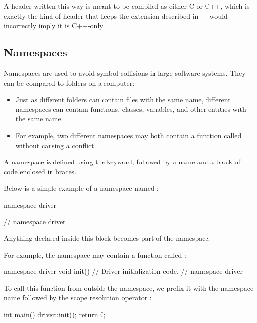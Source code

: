 \note A header written this way is meant to be compiled as either C or C++, which is exactly the
kind of header that keeps the  extension described in  --- 
would incorrectly imply it is C++-only.

\subsection{Namespaces}
\label{c1:sec:namespaces}
Namespaces are used to avoid symbol collisions in large software systems. They can be compared to
folders on a computer:
\begin{itemize}
  \item Just as different folders can contain files with the same name, different namespaces can
    contain functions, classes, variables, and other entities with the same name.
  \item For example, two different namespaces may both contain a function called 
    without causing a conflict.
\end{itemize}
A namespace is defined using the  keyword, followed by a name and a block of code
enclosed in braces.

Below is a simple example of a namespace named :

\begin{cppcode}
namespace driver
{

} // namespace driver
\end{cppcode}

\noindent Anything declared inside this block becomes part of the  namespace.

For example, the namespace may contain a function called :

\begin{cppcode}
namespace driver
{
void init()
{
    // Driver initialization code.
}
} // namespace driver
\end{cppcode}

\noindent To call this function from outside the namespace, we prefix it with the namespace name
followed by the scope resolution operator \code{::}:

\begin{cppcode}
int main()
{
    driver::init();
    return 0;
}
\end{cppcode}

